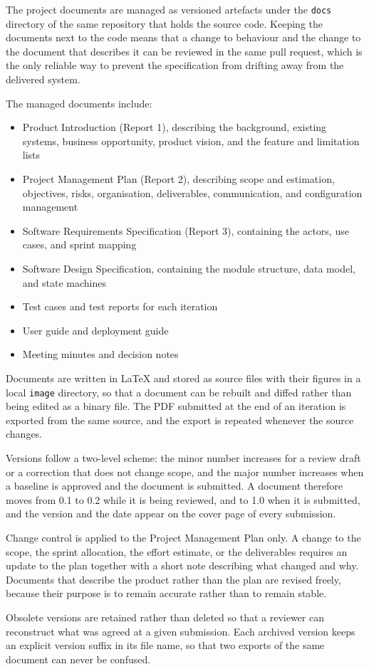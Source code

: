 The project documents are managed as versioned artefacts under the \texttt{docs} directory of the same repository that holds the source code. Keeping the documents next to the code means that a change to behaviour and the change to the document that describes it can be reviewed in the same pull request, which is the only reliable way to prevent the specification from drifting away from the delivered system.

The managed documents include:

\begin{itemize}
    \item Product Introduction (Report 1), describing the background, existing systems, business opportunity, product vision, and the feature and limitation lists
    \item Project Management Plan (Report 2), describing scope and estimation, objectives, risks, organisation, deliverables, communication, and configuration management
    \item Software Requirements Specification (Report 3), containing the actors, use cases, and sprint mapping
    \item Software Design Specification, containing the module structure, data model, and state machines
    \item Test cases and test reports for each iteration
    \item User guide and deployment guide
    \item Meeting minutes and decision notes
\end{itemize}

Documents are written in LaTeX and stored as source files with their figures in a local \texttt{image} directory, so that a document can be rebuilt and diffed rather than being edited as a binary file. The PDF submitted at the end of an iteration is exported from the same source, and the export is repeated whenever the source changes.

Versions follow a two-level scheme: the minor number increases for a review draft or a correction that does not change scope, and the major number increases when a baseline is approved and the document is submitted. A document therefore moves from 0.1 to 0.2 while it is being reviewed, and to 1.0 when it is submitted, and the version and the date appear on the cover page of every submission.

Change control is applied to the Project Management Plan only. A change to the scope, the sprint allocation, the effort estimate, or the deliverables requires an update to the plan together with a short note describing what changed and why. Documents that describe the product rather than the plan are revised freely, because their purpose is to remain accurate rather than to remain stable.

Obsolete versions are retained rather than deleted so that a reviewer can reconstruct what was agreed at a given submission. Each archived version keeps an explicit version suffix in its file name, so that two exports of the same document can never be confused.
